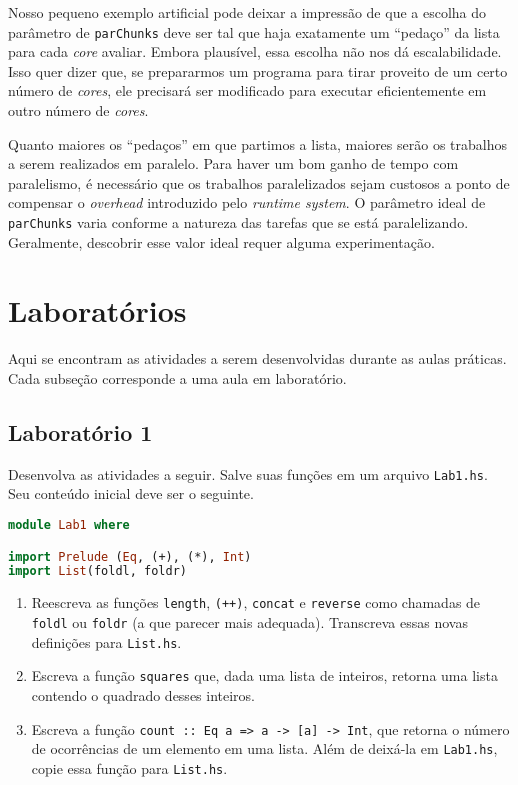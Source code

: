\documentclass[a4paper]{article}
\begin{document}
Nosso pequeno exemplo artificial pode deixar a impressão de que a escolha do parâmetro de \texttt{parChunks} deve ser tal que haja exatamente um ``pedaço'' da lista para cada \emph{core} avaliar.
Embora plausível, essa escolha não nos dá escalabilidade.
Isso quer dizer que, se prepararmos um programa para tirar proveito de um certo número de \emph{cores}, ele precisará ser modificado para executar eficientemente em outro número de \emph{cores}.

Quanto maiores os ``pedaços'' em que partimos a lista, maiores serão os trabalhos a serem realizados em paralelo.
Para haver um bom ganho de tempo com paralelismo, é necessário que os trabalhos paralelizados sejam custosos a ponto de compensar o \emph{overhead} introduzido pelo \emph{runtime system}.
O parâmetro ideal de \texttt{parChunks} varia conforme a natureza das tarefas que se está paralelizando.
Geralmente, descobrir esse valor ideal requer alguma experimentação.

\pagebreak

\section{Laboratórios}

Aqui se encontram as atividades a serem desenvolvidas durante as aulas práticas.
Cada subseção corresponde a uma aula em laboratório.

\subsection{Laboratório 1}

Desenvolva as atividades a seguir.
Salve suas funções em um arquivo \texttt{Lab1.hs}.
Seu conteúdo inicial deve ser o seguinte.

\begin{lstlisting}[language=haskell, frame=single]
module Lab1 where

import Prelude (Eq, (+), (*), Int)
import List(foldl, foldr)
\end{lstlisting}

\begin{enumerate}
	\item
		Reescreva as funções \texttt{length}, \texttt{(++)}, \texttt{concat} e \texttt{reverse} como chamadas de \texttt{foldl} ou \texttt{foldr} (a que parecer mais adequada).
		Transcreva essas novas definições para \texttt{List.hs}.
	\item
		Escreva a função \texttt{squares} que, dada uma lista de inteiros, retorna uma lista contendo o quadrado desses inteiros.
	\item
		Escreva a função \texttt{count :: Eq a => a -> [a] -> Int}, que retorna o número de ocorrências de um elemento em uma lista.
		Além de deixá-la em \texttt{Lab1.hs}, copie essa função para \texttt{List.hs}.
\end{enumerate}
\end{document}
